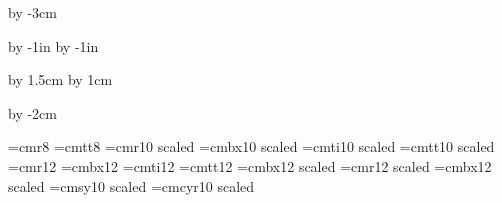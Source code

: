 











%


\enablehyperlinks[dvipdfm]


\hsize=210mm
\vsize=297mm

\parindent=0pt

\advance\vsize by -3cm

\advance\voffset by -1in
\advance\hoffset by -1in

\advance\voffset by 1.5cm
\advance\hoffset by 1cm

\advance\hsize by -2cm


{}

\font\small=cmr8
\font\smalltt=cmtt8
\font\medium=cmr10 scaled \magstephalf
\font\mediumbx=cmbx10 scaled \magstephalf
\font\mediumit=cmti10 scaled \magstephalf
\font\mediumtt=cmtt10 scaled \magstephalf
\font\large=cmr12
\font\largebx=cmbx12
\font\largeit=cmti12
\font\largett=cmtt12
\font\Largebx=cmbx12 scaled \magstephalf
\font\huge=cmr12 scaled 
\font\hugebx=cmbx12 scaled 
\font\mediumsy=cmsy10 scaled \magstephalf
\font\mediumcy=cmcyr10 scaled \magstephalf

